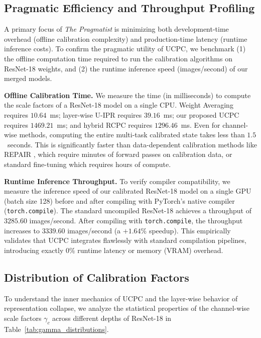 \documentclass{article}
\theoremstyle{plain}
\theoremstyle{definition}
\theoremstyle{remark}
\begin{document}
\subsection{Pragmatic Efficiency and Throughput Profiling}
A primary focus of \textit{The Pragmatist} is minimizing both development-time overhead (offline calibration complexity) and production-time latency (runtime inference costs). To confirm the pragmatic utility of UCPC, we benchmark (1) the offline computation time required to run the calibration algorithms on ResNet-18 weights, and (2) the runtime inference speed (images/second) of our merged models.

\textbf{Offline Calibration Time.} We measure the time (in milliseconds) to compute the scale factors of a ResNet-18 model on a single CPU. Weight Averaging requires $10.64$~ms; layer-wise U-IPR requires $39.16$~ms; our proposed UCPC requires $1469.21$~ms; and hybrid RCPC requires $1296.46$~ms.
Even for channel-wise methods, computing the entire multi-task calibrated state takes less than $1.5$~seconds. This is significantly faster than data-dependent calibration methods like REPAIR \cite{jordan23}, which require minutes of forward passes on calibration data, or standard fine-tuning which requires hours of compute.

\textbf{Runtime Inference Throughput.} To verify compiler compatibility, we measure the inference speed of our calibrated ResNet-18 model on a single GPU (batch size 128) before and after compiling with PyTorch's native compiler (\texttt{torch.compile}).
The standard uncompiled ResNet-18 achieves a throughput of $3285.60$ images/second. After compiling with \texttt{torch.compile}, the throughput increases to $3339.60$ images/second (a $+1.64\%$ speedup).
This empirically validates that UCPC integrates flawlessly with standard compilation pipelines, introducing exactly $0\%$ runtime latency or memory (VRAM) overhead.

\subsection{Distribution of Calibration Factors}
To understand the inner mechanics of UCPC and the layer-wise behavior of representation collapse, we analyze the statistical properties of the channel-wise scale factors $\gamma_c$ across different depths of ResNet-18 in Table~\ref{tab:gamma_distributions}.
\end{document}
